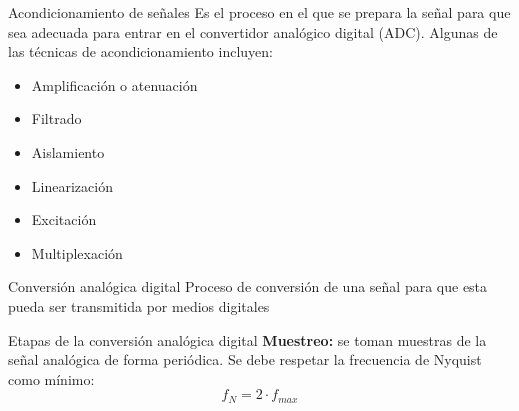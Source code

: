 \documentclass[aspectratio=169]{beamer}
\begin{document}
\begin{frame}{Acondicionamiento de señales}
Es el proceso en el que se prepara la señal para que sea adecuada para entrar en el convertidor analógico digital (ADC). Algunas de las técnicas de acondicionamiento incluyen:

\begin{itemize}
    \item Amplificación o atenuación
    \item Filtrado
    \item Aislamiento
    \item Linearización
    \item Excitación
    \item Multiplexación
\end{itemize}
\end{frame}

\begin{frame}[t]{Conversión analógica digital}
Proceso de conversión de una señal para que esta pueda ser transmitida por medios digitales
\end{frame}

\begin{frame}[t]{Etapas de la conversión analógica digital}
\textbf{Muestreo:} se toman muestras de la señal analógica de forma periódica. Se debe respetar la frecuencia de Nyquist como mínimo: 
\begin{equation*}
    f_N=2 \cdot f_{max}
\end{equation*}

\end{frame}
\end{document}
